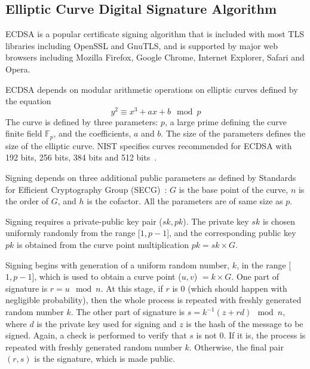 \subsection{Elliptic Curve Digital Signature Algorithm}
\label{sec:ecdsa}
ECDSA is a popular certificate signing algorithm that is included with most TLS libraries including OpenSSL and GnuTLS, and is supported by major web browsers including Mozilla Firefox, Google Chrome, Internet Explorer, Safari and Opera. %

ECDSA depends on modular arithmetic operations on elliptic curves defined by the equation \[y^2 \equiv x^3 + ax + b \mod p\] 
The curve is defined by three parameters: $p$, a large prime defining the curve finite field $\mathbb{F}_p$, and the coefficients, $a$ and $b$.  The size of the parameters defines the size of the elliptic curve.  %
NIST specifies curves recommended for ECDSA with 192 bits, 256 bits, 384 bits and 512 bits~\cite{nistCurves}. %

Signing depends on three additional public parameters as defined by Standards for Efficient Cryptography Group (SECG)~\cite{elliptic_curve_domain_parameters}: $G$ is the base point of the curve, $n$ is the order of $G$, and $h$ is the cofactor. All the parameters are of same size as $p$.

Signing requires a private-public key pair ($sk, pk$). The private key $sk$ is chosen uniformly randomly from the range [$1, p-1$], and the corresponding public key $pk$ is obtained from the curve point multiplication $pk = sk \times G$.

Signing begins with generation of a uniform random number, $k$, in the range [$1, p-1$], which is used to obtain a curve point ($u, v$) $ = k \times G$. 
One part of signature is $r = u \mod n$. At this stage, if $r$ is 0 (which should happen with negligible probability), then the whole process is repeated with freshly generated random number $k$. The other part of signature is $s = k^{-1}(z + rd) \mod n$, where $d$ is the private key used for signing and $z$ is the hash of the message to be signed.  Again, a check is performed to verify that $s$ is not 0. If it is, the process is repeated with freshly generated random number $k$. Otherwise, the final pair $(r, s)$ is the signature, which is made public.  %


